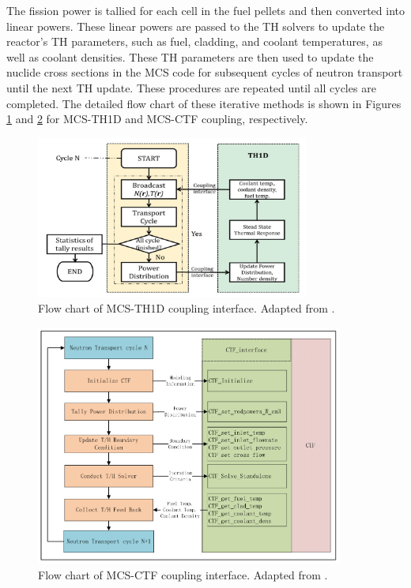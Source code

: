 The fission power is tallied for each cell in the fuel pellets and then converted into linear powers. These linear powers are passed to the TH solvers to update the reactor's TH parameters, such as fuel, cladding, and coolant temperatures, as well as coolant densities. These TH parameters are then used to update the nuclide cross sections in the MCS code for subsequent cycles of neutron transport until the next TH update. These procedures are repeated until all cycles are completed. The detailed flow chart of these iterative methods is shown in Figures \ref{fig_30a} and \ref{fig_30b} for MCS-TH1D and MCS-CTF coupling, respectively.
\begin{figure}
    \centering
    \includegraphics[width=0.8\textwidth]{figs/mcs_th1d.png}
    \caption[Flow chart of MCS-TH1D coupling interface.]{Flow chart of MCS-TH1D coupling interface. Adapted from \cite{yu_2018}.}
    \label{fig_30a}
\end{figure}
\begin{figure}
    \centering
    \includegraphics[width=0.9\textwidth]{figs/mcs_ctf.png}
    \caption[Flow chart of MCS-CTF coupling interface.]{Flow chart of MCS-CTF coupling interface. Adapted from \cite{yu_2018}.}
    \label{fig_30b}
\end{figure}


